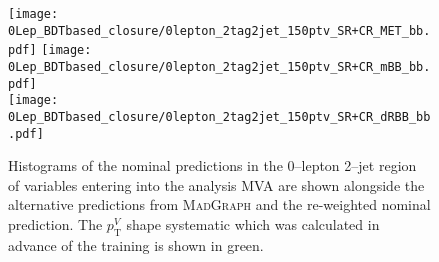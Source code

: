 \begin{figure}[ht!]
  \centering
  \texttt{[image: 0Lep\_BDTbased\_closure/0lepton\_2tag2jet\_150ptv\_SR+CR\_MET\_bb.pdf]}
  \texttt{[image: 0Lep\_BDTbased\_closure/0lepton\_2tag2jet\_150ptv\_SR+CR\_mBB\_bb.pdf]}  \\
  \texttt{[image: 0Lep\_BDTbased\_closure/0lepton\_2tag2jet\_150ptv\_SR+CR\_dRBB\_bb.pdf]}
  \\
  \caption[Nominal, alternative and re-weighted nominal predictions of $W+$jets
  events (0--lepton channel, 2--jet category, MVA input variables).] {Histograms
    of the nominal predictions in the 0--lepton 2--jet region of variables
    entering into the analysis MVA are shown alongside the alternative
    predictions from \textsc{MadGraph} and the re-weighted nominal prediction.
    The $p_{\mathrm{T}}^V$ shape systematic which was calculated in advance of the training
    is shown in green.}
    \label{fig:wjets_0lep_2jet_BDTrClosure_1}
\end{figure}